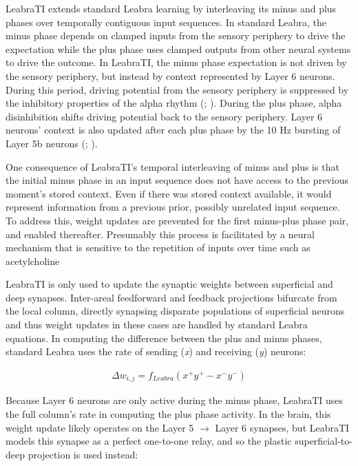 \documentclass[dwyatte_dissertation.tex]{subfiles}
\begin{document}
LeabraTI extends standard Leabra learning by interleaving its minus and plus phases over temporally contiguous input sequences. In standard Leabra, the minus phase depends on clamped inputs from the sensory periphery to drive the expectation while the plus phase uses clamped outputs from other neural systems to drive the outcome. In LeabraTI, the minus phase expectation is not driven by the sensory periphery, but instead by context represented by Layer 6 neurons. During this period, driving potential from the sensory periphery is suppressed by the inhibitory properties of the alpha rhythm (; ). During the plus phase, alpha disinhibition shifts driving potential back to the sensory periphery. Layer 6 neurons' context is also updated after each plus phase by the 10 Hz bursting of Layer 5b neurons (; ). 

One consequence of LeabraTI's temporal interleaving of minus and plus is that the initial minus phase in an input sequence does not have access to the previous moment's stored context. Even if there was stored context available, it would represent information from a previous prior, possibly unrelated input sequence. To address this, weight updates are prevented for the first minus-plus phase pair, and enabled thereafter. Presumably this process is facilitated by a neural mechanism that is sensitive to the repetition of inputs over time such as acetylcholine \cite{ThielHensonMorrisEtAl01,ThielHensonDolan02}

LeabraTI is only used to update the synaptic weights between superficial and deep synapses. Inter-areal feedforward and feedback projections bifurcate from the local column, directly synapsing disparate populations of superficial neurons and thus weight updates in these cases are handled by standard Leabra equations. In computing the difference between the plus and minus phases, standard Leabra uses the rate of sending (\textit{x}) and receiving (\textit{y}) neurons:

\begin{align*}
\Delta w_{i,j} = f_{Leabra}(x^+y^+ - x^-y^-)
\end{align*}

Because Layer 6 neurons are only active during the minus phase, LeabraTI uses the full column's rate in computing the plus phase activity. In the brain, this weight update likely operates on the Layer 5 $\rightarrow$ Layer 6 synapses, but LeabraTI models this synapse as a perfect one-to-one relay, and so the plastic superficial-to-deep projection is used instead:
\end{document}
